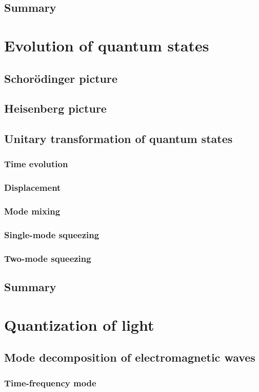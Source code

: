 \documentclass{book}
\begin{document}
\section{Summary}

\chapter{Evolution of quantum states}
\section{Schor\"odinger picture}
\section{Heisenberg picture}
\section{Unitary transformation of quantum states}
\subsection{Time evolution}
\subsection{Displacement}
\subsection{Mode mixing}
\subsection{Single-mode squeezing}
\subsection{Two-mode squeezing}
\section{Summary}

\chapter{Quantization of light}
\section{Mode decomposition of electromagnetic waves}
\subsection{Time-frequency mode}
\end{document}
